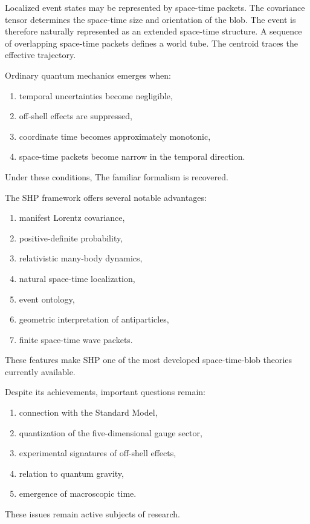Localized event states may be represented by space-time packets.
The covariance tensor
determines the space-time size and orientation of the blob.
The event is therefore naturally represented as an extended 
space-time structure.
A sequence of overlapping space-time packets defines a world tube.
The centroid
traces the effective trajectory.

Ordinary quantum mechanics emerges when:
\begin{enumerate}
\item temporal uncertainties become negligible,
\item off-shell effects are suppressed,
\item coordinate time becomes approximately monotonic,
\item space-time packets become narrow in the temporal direction.
\end{enumerate}
Under these conditions,
The familiar formalism is recovered.

The SHP framework offers several notable advantages:
\begin{enumerate}
\item manifest Lorentz covariance,
\item positive-definite probability,
\item relativistic many-body dynamics,
\item natural space-time localization,
\item event ontology,
\item geometric interpretation of antiparticles,
\item finite space-time wave packets.
\end{enumerate}
These features make SHP one of the most developed space-time-blob
theories currently available.

Despite its achievements, important questions remain:
\begin{enumerate}
\item connection with the Standard Model,
\item quantization of the five-dimensional gauge sector,
\item experimental signatures of off-shell effects,
\item relation to quantum gravity,
\item emergence of macroscopic time.
\end{enumerate}
These issues remain active subjects of research.

